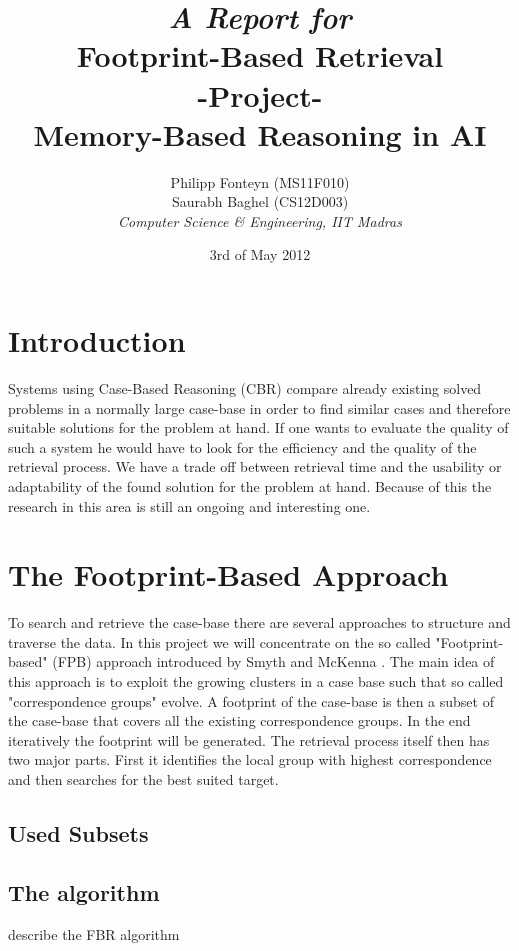 \documentclass[11pt]{article}
\title{
	\emph{A Report for}\\
	\huge{\textbf{Footprint-Based Retrieval} }\\
	-Project-\\
	Memory-Based Reasoning in AI\\[2em]	
}
\author{
	Philipp Fonteyn (MS11F010)\\
	Saurabh Baghel (CS12D003)\\[2em]
	\emph{Computer Science \& Engineering, IIT Madras}
}
\date{3rd of May 2012}
\begin{document}
\maketitle
\newpage

%
%
%
\section{Introduction}
Systems using Case-Based Reasoning (CBR) compare already existing solved problems in a normally large case-base in order to find similar cases and therefore suitable solutions for the problem at hand. If one wants to evaluate the quality of such a system he would have to look for the efficiency and the quality of the retrieval process. We have a trade off between retrieval time and the usability or adaptability of the found solution for the problem at hand. Because of this the research in this area is still an ongoing and interesting one.
%
%
%
\section{The Footprint-Based Approach}
To search and retrieve the case-base there are several approaches to structure and traverse the data. In this project we will concentrate on the so called "Footprint-based" (FPB) approach introduced by Smyth and McKenna \cite{FPBR}. The main idea of this approach is to exploit the growing clusters in a case base such that so called "correspondence groups" evolve. A footprint of the case-base is then a subset of the case-base that covers all the existing correspondence groups. In the end iteratively the footprint will be generated. The retrieval process itself then has two major parts. First it identifies the local group with highest correspondence and then searches for the best suited target. 

\subsection{Used Subsets}

\subsection{The algorithm}
describe the FBR algorithm
\end{document}
